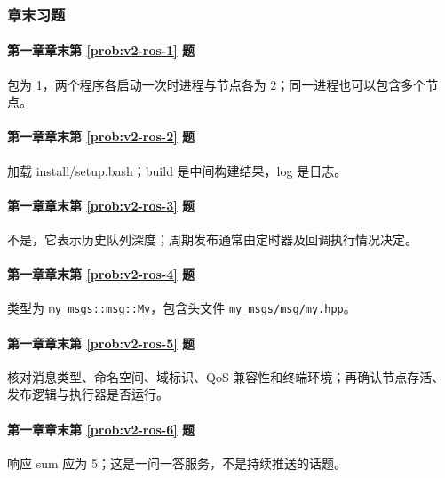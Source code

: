 \subsubsection*{章末习题}

\paragraph*{第一章章末第 \ref{prob:v2-ros-1} 题}
\begin{solution}
包为 1，两个程序各启动一次时进程与节点各为 2；同一进程也可以包含多个节点。
\end{solution}

\paragraph*{第一章章末第 \ref{prob:v2-ros-2} 题}
\begin{solution}
加载 install/setup.bash；build 是中间构建结果，log 是日志。
\end{solution}

\paragraph*{第一章章末第 \ref{prob:v2-ros-3} 题}
\begin{solution}
不是，它表示历史队列深度；周期发布通常由定时器及回调执行情况决定。
\end{solution}

\paragraph*{第一章章末第 \ref{prob:v2-ros-4} 题}
\begin{solution}
类型为 \texttt{my\_msgs::msg::My}，包含头文件 \texttt{my\_msgs/msg/my.hpp}。
\end{solution}

\paragraph*{第一章章末第 \ref{prob:v2-ros-5} 题}
\begin{solution}
核对消息类型、命名空间、域标识、QoS 兼容性和终端环境；再确认节点存活、发布逻辑与执行器是否运行。
\end{solution}

\paragraph*{第一章章末第 \ref{prob:v2-ros-6} 题}
\begin{solution}
响应 sum 应为 5；这是一问一答服务，不是持续推送的话题。
\end{solution}

